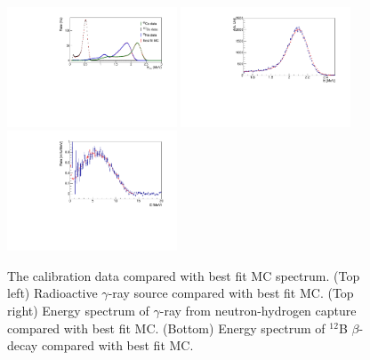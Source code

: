 \documentclass{article}
\begin{document}
\begin{figure}[h!]
\centering
\includegraphics[width=0.45\textwidth]{CalibPaperPlot.pdf}
\includegraphics[width=0.45\textwidth]{hCf252v2.pdf}
\includegraphics[width=0.45\textwidth]{hB12v2.pdf}
\caption{The calibration data compared with best fit MC spectrum. 
(Top left) Radioactive $\gamma$-ray source compared with best fit MC.
(Top right) Energy spectrum of $\gamma$-ray from neutron-hydrogen capture compared with best fit MC.
(Bottom) Energy spectrum of $^{12}$B $\beta$-decay compared with best fit MC.}
\label{fig:gammacalibration}
\end{figure}
\end{document}
